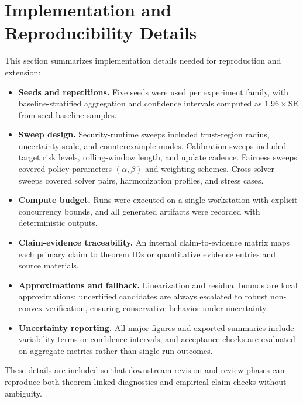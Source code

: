 \documentclass{article} %
\begin{document}
\section{Implementation and Reproducibility Details}
This section summarizes implementation details needed for reproduction and extension:
\begin{itemize}
\item \textbf{Seeds and repetitions.} Five seeds were used per experiment family, with baseline-stratified aggregation and confidence intervals computed as $1.96\times\mathrm{SE}$ from seed-baseline samples.
\item \textbf{Sweep design.} Security-runtime sweeps included trust-region radius, uncertainty scale, and counterexample modes. Calibration sweeps included target risk levels, rolling-window length, and update cadence. Fairness sweeps covered policy parameters $(\alpha,\beta)$ and weighting schemes. Cross-solver sweeps covered solver pairs, harmonization profiles, and stress cases.
\item \textbf{Compute budget.} Runs were executed on a single workstation with explicit concurrency bounds, and all generated artifacts were recorded with deterministic outputs.
\item \textbf{Claim-evidence traceability.} An internal claim-to-evidence matrix maps each primary claim to theorem IDs or quantitative evidence entries and source materials.
\item \textbf{Approximations and fallback.} Linearization and residual bounds are local approximations; uncertified candidates are always escalated to robust non-convex verification, ensuring conservative behavior under uncertainty.
\item \textbf{Uncertainty reporting.} All major figures and exported summaries include variability terms or confidence intervals, and acceptance checks are evaluated on aggregate metrics rather than single-run outcomes.
\end{itemize}

These details are included so that downstream revision and review phases can reproduce both theorem-linked diagnostics and empirical claim checks without ambiguity.
\end{document}
